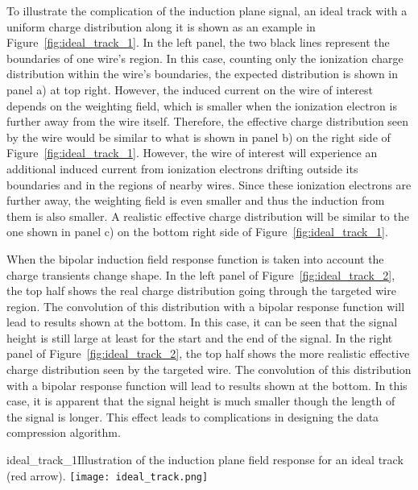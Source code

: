 To illustrate the complication of the induction plane signal,  
an ideal track with a uniform charge distribution along it %
is shown as 
an example in Figure~\ref{fig:ideal_track_1}. In the left panel, the 
two black lines represent the boundaries of one wire's region. In this case,  
counting only the ionization charge distribution within the wire's boundaries,
the expected 
distribution is shown in panel a) at top right.  However, the induced current on the wire of 
interest depends on the weighting field, which is smaller when the ionization electron is 
further away from the wire itself. Therefore, the effective charge distribution seen by 
the wire would be similar to what is shown in panel b) on the right side of 
Figure~\ref{fig:ideal_track_1}. 
However, the wire of interest will experience an 
additional induced current from ionization electrons 
drifting outside its boundaries and in the regions of nearby wires. 
Since these ionization electrons are further away, 
the weighting field is even smaller and thus the induction from them is 
also smaller. A realistic effective charge distribution will be similar to the one shown in panel c) on 
the bottom right side of Figure~\ref{fig:ideal_track_1}. 


When the bipolar induction field response function is taken into account the 
charge transients change shape.
In the left panel of Figure~\ref{fig:ideal_track_2}, the top half shows 
the real charge distribution going through the targeted wire region. The convolution of this 
distribution with a bipolar response function will lead to results shown at the bottom. In this 
case, it can be seen that the signal height is still large at least for the start and the end of the 
signal. In the right panel of Figure~\ref{fig:ideal_track_2}, the top half shows the more 
realistic effective charge distribution seen by the targeted wire. The convolution of this 
distribution with a bipolar response function will lead to results shown at the bottom. In 
this case, it is apparent that the signal height is much smaller though the length of the signal is 
longer. This effect leads to complications in designing the data compression algorithm.

\begin{cdrfigure}{ideal_track_1}{Illustration of the induction plane field response for an ideal track (red arrow).}
  \texttt{[image: ideal\_track.png]}
\end{cdrfigure}

